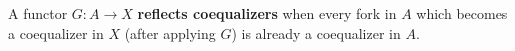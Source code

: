 A functor $G: A \to X$ \textbf{reflects coequalizers} when every fork in $A$ which becomes a coequalizer in $X$ (after applying $G$) is already a coequalizer in $A$.
